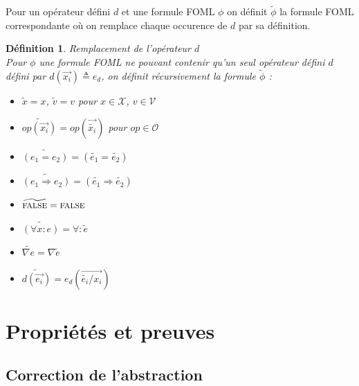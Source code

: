 \documentclass[12pt]{article}
\newcommand{\bpar}[1]{\marginpar{\color{myblue}\footnotesize\raggedright#1}}
\newcommand{\FALSE}{\textsc{false}}
\newtheorem{defin}{Définition}
\begin{document}
Pour un opérateur défini $d$ et une formule FOML $\phi$ on définit $\widetilde{\phi}$ la formule FOML correspondante où on remplace chaque occurence de $d$ par sa définition.

\begin{defin} \emph{Remplacement de l'opérateur $d$} \\
  Pour $\phi$ une formule FOML ne pouvant contenir qu'un seul opérateur défini $d$ défini par $d(\vec{x_i}) \triangleq e_d$, on définit récursivement la formule $\widetilde{\phi}$ :
  \begin{itemize}
  \item
    $\widetilde{x} = x$, $\widetilde{v} = v$ pour $x \in \mathcal{X}$, $v \in \mathcal{V}$
  \item
    $\widetilde{op(\vec{x_i})} = op(\vec{\widetilde{x_i}})$ pour $op \in \mathcal{O}$
  \item
    $\widetilde{(e_1 = e_2)} = (\widetilde{e_1} = \widetilde{e_2})$
  \item
    $\widetilde{(e_1 \Rightarrow e_2)} = (\widetilde{e_1} \Rightarrow \widetilde{e_2})$
  \item
    $\widetilde{\FALSE} = \FALSE$
  \item
    $\widetilde{(\forall x : e)} = \forall : \widetilde{e}$
  \item
    $\widetilde{\nabla e} = \nabla \widetilde{e}$
  \item
    $\widetilde{d(\vec{e_i})} = e_d(\vec{\widetilde{e_i}/x_i})$
  \end{itemize}
\end{defin}


\section{Propriétés et preuves}

\subsection{Correction de l'abstraction}

\end{document}
